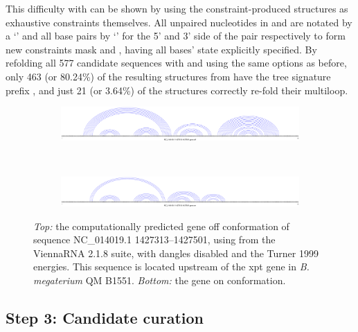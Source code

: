 This difficulty with \rfold can be shown by using the constraint-produced
structures as exhaustive constraints themselves. All unpaired nucleotides in
\strOff and \strOn are notated by a `' and all base pairs by `\ms{()}' for
the 5' and 3' side of the pair respectively to form new constraints mask
 and , having all bases' state explicitly specified. By
refolding all 577 candidate sequences with  and  using
the same options as before, only 463 (or 80.24\%) of the resulting structures from
 have the tree signature prefix \ms{[0,1,2,2,1]}, and just 21 (or
3.64\%) of the  structures correctly re-fold their multiloop.

\begin{figure}[!ht]
\centering
\begin{subfigure}[h]{\textwidth}
\centering
\includegraphics[width=.9\textwidth]{Figures/Ribofinder/NC_014019_1_1427313_1427501_OFF.pdf}
\end{subfigure} \\
\medskip
\begin{subfigure}[h]{\textwidth}
\centering
\includegraphics[width=.9\textwidth]{Figures/Ribofinder/NC_014019_1_1427313_1427501_ON.pdf}
\end{subfigure}
\caption{{\em Top:} the computationally predicted gene off conformation of
sequence NC\_014019.1 1427313--1427501, using \rfold from the ViennaRNA 2.1.8
suite, with dangles disabled and the Turner 1999 energies. This sequence is
located upstream of the xpt gene in {\em B. megaterium} QM B1551. {\em Bottom:}
the gene on conformation.}
\label{fig:figure:exampleSS}
\end{figure}

\subsection{Step 3: Candidate curation}
\label{subsec:rfinder:curation}

